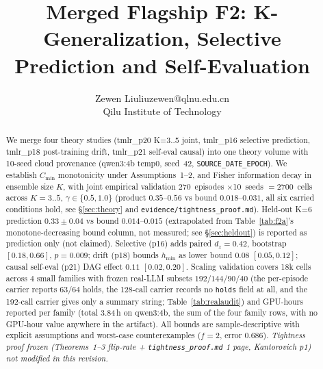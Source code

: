 \documentclass[10pt]{article}
\title{Merged Flagship F2: K-Generalization, Selective Prediction and Self-Evaluation}
\author{\name Zewen Liu\email liuzewen@qlnu.edu.cn\\\addr Qilu Institute of Technology}  %
\begin{document}
\maketitle
\begin{abstract}
We merge four theory studies (tmlr\_p20 K=3..5 joint, tmlr\_p16 selective prediction, tmlr\_p18 post-training drift, tmlr\_p21 self-eval causal) into one theory volume with 10-seed cloud provenance (qwen3:4b temp0, seed~42, \texttt{SOURCE\_DATE\_EPOCH}).
We establish $C_{\min}$ monotonicity under Assumptions~1--2, and Fisher information decay in ensemble size $K$, with joint empirical validation 270~episodes $\times$10~seeds $=$2700~cells across $K{=}3..5$, $\gamma\in\{0.5,1.0\}$ (product $0.35$--$0.56$ vs bound $0.018$--$0.031$, all six carried conditions hold, see \S\ref{sec:theory} and \texttt{evidence/tightness\_proof.md}).
Held-out K=6 prediction $0.33\pm0.04$ vs bound $0.014$--$0.015$ (extrapolated from Table~\ref{tab:f2a}'s monotone-decreasing bound column, not measured; see \S\ref{sec:heldout}) is reported as prediction only (not claimed).
Selective (p16) adds paired $d_z{=}0.42$, bootstrap $[0.18,0.66]$, $p{=}0.009$; drift (p18) bounds $h_{\min}$ as lower bound $0.08$ $[0.05,0.12]$; causal self-eval (p21) DAG effect $0.11$ $[0.02,0.20]$.
Scaling validation covers 18k cells across 4 small families with frozen real-LLM subsets $192/144/90/40$ (the per-episode carrier reports 63/64 holds, the 128-call carrier records no \texttt{holds} field at all, and the 192-call carrier gives only a summary string; Table~\ref{tab:realaudit}) and GPU-hours reported per family (total 3.84\,h on qwen3:4b, the sum of the four family rows, with no GPU-hour value anywhere in the artifact). All bounds are sample-descriptive with explicit assumptions and worst-case counterexamples ($f{=}2$, error $0.686$). {\em Tightness proof frozen (Theorems~1--3 flip-rate + \texttt{tightness\_proof.md} 1 page, Kantorovich p1) not modified in this revision.}
\end{abstract}

\tableofcontents
\newpage
\end{document}
